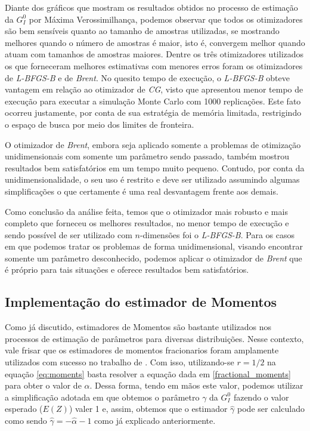 \documentclass[12pt]{article}
\begin{document}
Diante dos gráficos que mostram os resultados obtidos no processo de estimação da $G_I^0$ por Máxima Verossimilhança, podemos observar que todos os otimizadores são bem sensíveis quanto ao tamanho de amostras utilizadas, se mostrando melhores quando o número de amostras é maior, isto é, convergem melhor quando atuam com tamanhos de amostras maiores. Dentre os três otimizadores utilizados os que forneceram melhores estimativas com menores erros foram os otimizadores de \emph{L-BFGS-B} e de \emph{Brent}. No quesito tempo de execução, o \emph{L-BFGS-B} obteve vantagem em relação ao otimizador de \emph{CG}, visto que apresentou menor tempo de execução para executar a simulação Monte Carlo com 1000 replicações. Este fato ocorreu justamente, por conta de sua estratégia de memória limitada, restrigindo o espaço de busca por meio dos limites de fronteira.

O otimizador de \emph{Brent}, embora seja aplicado somente a problemas de otimização unidimensionais com somente um parâmetro sendo passado, também mostrou resultados bem satisfatórios em um tempo muito pequeno. Contudo, por conta da unidimensionalidade, o seu uso é restrito e deve ser utilizado assumindo algumas simplificações o que certamente é uma real desvantagem frente aos demais.

Como conclusão da análise feita, temos que o otimizador mais robusto e mais completo que forneceu os melhores resultados, no menor tempo de execução e sendo possível de ser utilizado com $n$-dimensões foi o \emph{L-BFGS-B}. Para os casos em que podemos tratar os problemas de forma unidimensional, visando encontrar somente um parâmetro desconhecido, podemos aplicar o otimizador de \emph{Brent} que é próprio para tais situações e oferece resultados bem satisfatórios.

\subsection{Implementação do estimador de Momentos}

Como já discutido, estimadores de Momentos são bastante utilizados nos processos de estimação de parâmetros para diversas distribuições. Nesse contexto, vale frisar que os estimadores de momentos fracionarios foram amplamente utilizados com sucesso no trabalho de \citet{Clutter1997}. Com isso, utilizando-se $r = 1/2$ na equação \eqref{eq:moments} basta resolver a equação dada em \eqref{fractional_moments} para obter o valor de $\widehat{\alpha}$. Dessa forma, tendo em mãos este valor, podemos utilizar a simplificação adotada em que obtemos o parâmetro $\gamma$ da $G_I^0$ fazendo o valor esperado ($E(Z)$) valer 1 e, assim, obtemos que o estimador $\widehat{\gamma}$ pode ser calculado como sendo $\widehat{\gamma} = -\widehat{\alpha} - 1$ como já explicado anteriormente.
\end{document}
